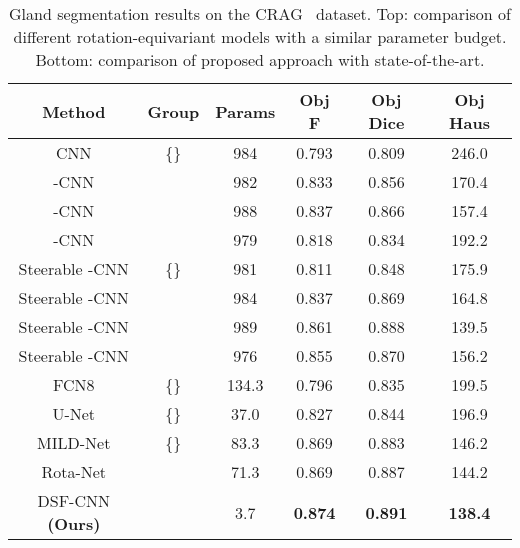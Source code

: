 \documentclass[journal]{IEEEtran}
\begin{document}
	
\begin{table}[h]
		\begin{center}
			\caption{Gland segmentation results on the CRAG~\cite{graham2019mild} dataset. Top: comparison of different rotation-equivariant models with a similar parameter budget. Bottom: comparison of proposed approach with state-of-the-art.}
			\label{dup2 table:comparative_crag}
			\setlength{\tabcolsep}{2pt} \renewcommand{\arraystretch}{1} \begin{tabular}{c|c|c|c|c|c}
 					     \textbf{Method}
						 & \textbf{Group} & \textbf{Params}
						 & \textbf{Obj F} & \textbf{Obj Dice} & \textbf{Obj Haus } \\
					\midrule
					
					
CNN  & \{\} & 984 & 0.793 &    0.809 & 246.0 \\ 
					-CNN \cite{cohen2016group} &  & 982 & 0.833 & 0.856 & 170.4  \\ 
					-CNN \cite{bekkers2018roto,lafarge2020roto} &  & 988 &  0.837 & 0.866 & 157.4 \\ 
					-CNN \cite{bekkers2018roto,lafarge2020roto} &  & 979 &  0.818 & 0.834 & 192.2 \\ 
					Steerable -CNN \cite{weiler2018learning} & \{\} & 981 & 0.811 & 0.848 & 175.9 \\
					Steerable -CNN \cite{weiler2018learning} &  & 984 & 0.837 & 0.869 & 164.8 \\ 
					Steerable -CNN \cite{weiler2018learning} &  & 989 & 0.861 & 0.888 & 139.5 \\ 
					Steerable -CNN \cite{weiler2018learning} &  & 976 & 0.855 & 0.870 & 156.2 \\
					\midrule
					FCN8 \cite{ronneberger2015u} & \{\} & 134.3 &  0.796 & 0.835 & 199.5 \\
					U-Net \cite{ronneberger2015u} & \{\} & 37.0 & 0.827 & 0.844 & 196.9 \\ 
					MILD-Net \cite{graham2019mild} & \{\} & 83.3 & 0.869 & 0.883 & 146.2 \\ 
					Rota-Net \cite{graham2019rota} &  & 71.3 & 0.869 & 0.887 & 144.2  \\
					DSF-CNN \textbf{(Ours)} &  & 3.7 & \textbf{0.874} &  \textbf{0.891} & \textbf{138.4} \\ 
					\bottomrule
				\end{tabular}
		
		\end{center}
	\end{table}

	
\end{document}
